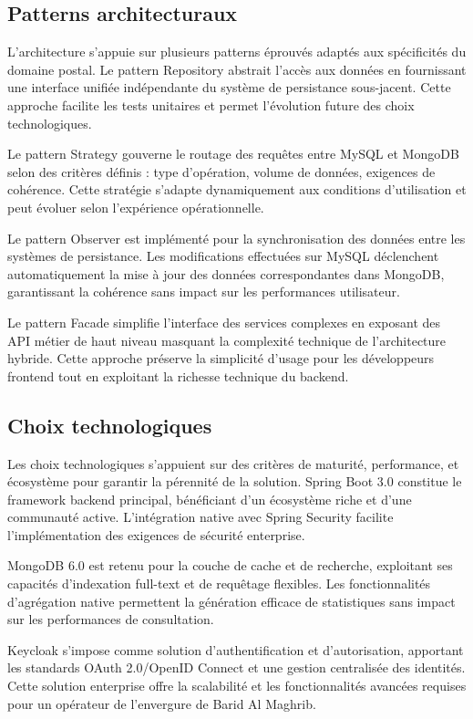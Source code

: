 \subsection{Patterns architecturaux}

L'architecture s'appuie sur plusieurs patterns éprouvés adaptés aux spécificités du domaine postal. Le pattern Repository abstrait l'accès aux données en fournissant une interface unifiée indépendante du système de persistance sous-jacent. Cette approche facilite les tests unitaires et permet l'évolution future des choix technologiques.

Le pattern Strategy gouverne le routage des requêtes entre MySQL et MongoDB selon des critères définis : type d'opération, volume de données, exigences de cohérence. Cette stratégie s'adapte dynamiquement aux conditions d'utilisation et peut évoluer selon l'expérience opérationnelle.

Le pattern Observer est implémenté pour la synchronisation des données entre les systèmes de persistance. Les modifications effectuées sur MySQL déclenchent automatiquement la mise à jour des données correspondantes dans MongoDB, garantissant la cohérence sans impact sur les performances utilisateur.

Le pattern Facade simplifie l'interface des services complexes en exposant des API métier de haut niveau masquant la complexité technique de l'architecture hybride. Cette approche préserve la simplicité d'usage pour les développeurs frontend tout en exploitant la richesse technique du backend.

\subsection{Choix technologiques}

Les choix technologiques s'appuient sur des critères de maturité, performance, et écosystème pour garantir la pérennité de la solution. Spring Boot 3.0 constitue le framework backend principal, bénéficiant d'un écosystème riche et d'une communauté active. L'intégration native avec Spring Security facilite l'implémentation des exigences de sécurité enterprise.

MongoDB 6.0 est retenu pour la couche de cache et de recherche, exploitant ses capacités d'indexation full-text et de requêtage flexibles. Les fonctionnalités d'agrégation native permettent la génération efficace de statistiques sans impact sur les performances de consultation.

Keycloak s'impose comme solution d'authentification et d'autorisation, apportant les standards OAuth 2.0/OpenID Connect et une gestion centralisée des identités. Cette solution enterprise offre la scalabilité et les fonctionnalités avancées requises pour un opérateur de l'envergure de Barid Al Maghrib.

